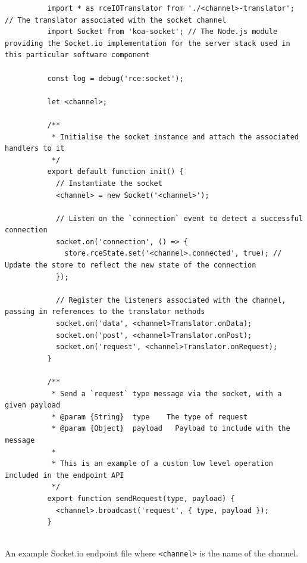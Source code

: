       \newpage
      \begin{code}
        \begin{verbatim}
          import * as rceIOTranslator from './<channel>-translator'; // The translator associated with the socket channel
          import Socket from 'koa-socket'; // The Node.js module providing the Socket.io implementation for the server stack used in this particular software component
          
          const log = debug('rce:socket');
          
          let <channel>;
          
          /**
           * Initialise the socket instance and attach the associated handlers to it
           */
          export default function init() {
            // Instantiate the socket
            <channel> = new Socket('<channel>');
          
            // Listen on the `connection` event to detect a successful connection
            socket.on('connection', () => {
              store.rceState.set('<channel>.connected', true); // Update the store to reflect the new state of the connection
            });
            
            // Register the listeners associated with the channel, passing in references to the translator methods
            socket.on('data', <channel>Translator.onData);
            socket.on('post', <channel>Translator.onPost);
            socket.on('request', <channel>Translator.onRequest);
          }
          
          /**
           * Send a `request` type message via the socket, with a given payload
           * @param	{String}  type    The type of request
           * @param {Object}  payload	Payload to include with the message
           *
           * This is an example of a custom low level operation included in the endpoint API
           */
          export function sendRequest(type, payload) {
            <channel>.broadcast('request', { type, payload });
          }
          
        \end{verbatim}
        \caption{An example Socket.io endpoint file where \texttt{<channel>} is the name of the channel.}
        \label{code:softDev-socketEndpointExample}
      \end{code}
    
